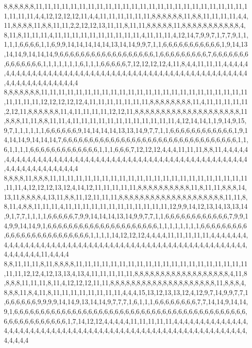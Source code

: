 8,8,8,8,8,8,11,11,11,11,11,11,11,11,11,11,11,11,11,11,11,11,11,11,11,11,11,11,11,11,11,11,11,11,4,4,12,12,12,12,11,4,4,11,11,11,11,11,11,8,8,8,8,8,8,11,8,8,11,11,11,11,4,4,11,8,8,8,8,11,8,8,11,11,2,2,12,12,13,11,11,8,11,11,8,8,8,8,8,11,8,8,8,8,8,8,8,8,8,8,8,4,8,11,8,11,11,11,4,11,11,11,11,11,11,11,11,11,11,4,11,11,11,4,12,14,7,9,9,7,1,7,7,9,1,1,1,1,1,6,6,6,6,1,1,6,9,9,14,14,14,14,14,13,14,14,9,9,7,1,1,6,6,6,6,6,6,6,6,6,6,6,1,9,14,13,14,14,9,14,14,14,9,6,6,6,6,6,6,6,6,6,6,6,6,6,6,6,6,6,6,1,6,6,6,6,6,6,6,6,6,7,6,6,6,6,6,6,6,6,6,6,6,6,6,6,1,1,1,1,1,1,1,6,1,1,1,6,6,6,6,6,7,12,12,12,12,4,11,8,4,4,11,11,11,4,4,4,4,4,4,4,4,4,4,4,4,4,4,4,4,4,4,4,4,4,4,4,4,4,4,4,4,4,4,4,4,4,4,4,4,4,4,4,4,4,4,4,4,4,4,4,4,4,4,4,4,4,4,4,4,4,4,4,4,4,4,4,4,4
8,8,8,8,8,8,8,11,11,11,11,11,11,11,11,11,11,11,11,11,11,11,11,11,11,11,11,11,11,11,11,11,11,11,11,12,12,12,12,12,4,11,11,11,11,11,11,11,8,8,8,8,8,8,8,8,11,4,11,11,11,11,11,2,12,11,8,8,8,8,8,8,11,4,11,11,11,11,12,12,11,8,8,8,8,8,8,8,8,8,8,8,8,8,8,8,8,8,8,8,8,11,8,8,8,11,11,8,8,11,11,4,11,11,11,11,11,11,11,11,11,11,11,11,4,12,14,14,1,1,9,14,9,15,9,7,1,1,1,1,1,1,6,6,6,6,6,6,9,14,14,14,14,13,13,14,9,7,7,1,1,6,6,6,6,6,6,6,6,6,6,6,6,1,9,14,14,14,9,14,14,14,7,6,6,6,6,6,6,6,6,6,6,6,6,6,6,6,6,6,6,6,6,6,6,6,6,6,6,6,6,6,6,6,6,6,1,1,6,1,1,1,1,6,6,6,6,6,6,6,6,6,6,6,6,6,1,1,1,6,6,6,7,12,12,12,4,4,4,11,11,11,8,8,11,4,4,4,4,4,4,4,4,4,4,4,4,4,4,4,4,4,4,4,4,4,4,4,4,4,4,4,4,4,4,4,4,4,4,4,4,4,4,4,4,4,4,4,4,4,4,4,4,4,4,4,4,4,4,4,4,4,4,4,4,4,4,4,4,4
8,8,8,8,11,8,8,8,11,11,11,11,11,11,11,11,11,11,11,11,11,11,11,11,11,11,11,11,11,11,11,11,11,4,12,12,12,13,12,4,14,12,11,11,11,11,11,8,8,8,8,8,8,8,8,8,8,11,8,11,11,8,8,8,14,13,11,8,8,8,8,4,13,11,8,8,11,12,11,11,11,8,8,8,8,8,8,8,8,8,8,8,8,8,8,8,8,8,8,8,8,11,11,8,8,11,4,8,8,11,11,11,4,11,11,11,11,11,11,11,11,11,11,11,11,12,9,9,14,12,13,14,13,13,14,9,1,7,7,1,1,1,1,6,6,6,6,6,7,9,9,14,14,14,13,14,9,9,7,7,1,1,6,6,6,6,6,6,6,6,6,6,6,6,7,9,9,14,9,9,14,14,9,1,6,6,6,6,6,6,6,6,6,6,6,6,6,6,6,6,6,6,6,6,6,1,1,1,1,1,1,1,1,6,6,6,6,6,6,6,6,6,6,6,6,6,6,6,6,6,6,6,6,6,6,6,6,6,1,1,1,1,14,12,12,12,4,4,4,4,11,11,11,11,11,4,4,4,4,4,4,4,4,4,4,4,4,4,4,4,4,4,4,4,4,4,4,4,4,4,4,4,4,4,4,4,4,4,4,4,4,4,4,4,4,4,4,4,4,4,4,4,4,4,4,4,4,4,4,4,4,4,4,4,4,11,4,4,4,4
8,8,11,11,11,8,11,8,8,8,8,11,11,11,11,11,11,11,11,11,11,11,11,11,11,11,11,11,11,11,11,11,11,12,12,4,12,13,13,4,13,4,11,11,11,11,11,8,8,8,8,8,8,8,8,8,8,8,8,8,8,8,8,8,8,4,11,8,8,8,8,11,11,11,8,11,4,12,12,12,11,11,8,8,8,8,8,8,8,8,8,8,8,8,8,8,8,8,8,8,8,8,11,8,8,8,4,8,8,8,11,8,4,11,8,11,11,11,11,11,11,11,11,4,4,4,15,13,12,13,13,12,4,12,9,7,14,9,9,7,7,1,6,6,6,6,6,6,9,9,9,9,14,14,9,13,14,14,9,7,7,7,1,6,1,1,1,6,6,6,6,6,6,6,6,7,7,14,14,9,14,14,9,1,6,6,6,6,6,6,6,6,6,6,6,6,6,6,6,6,6,6,6,6,6,6,6,6,6,6,6,6,6,6,6,6,6,6,6,6,6,6,6,6,6,6,6,6,6,6,6,6,6,6,6,6,6,6,6,6,1,7,14,12,12,4,4,4,4,4,11,11,11,11,11,4,4,4,4,4,4,4,4,4,4,4,4,4,4,4,4,4,4,4,4,4,4,4,4,4,4,4,4,4,4,4,4,4,4,4,4,4,4,4,4,4,4,4,4,4,4,4,4,4,4,4,4,4,4,4,4,4,4,4,4,4,4,4,4,4
